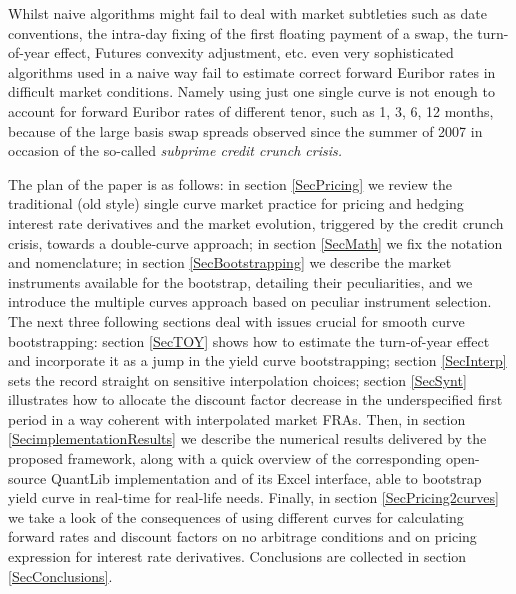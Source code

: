 \documentclass[11pt,reqno]{amsart}
\begin{document}
Whilst naive algorithms might fail to deal with market subtleties such as date conventions, the intra-day fixing of the first floating payment of a swap, the turn-of-year effect, Futures convexity adjustment, etc. even very sophisticated algorithms used in a naive way fail to estimate correct forward Euribor rates in difficult market conditions. Namely using just one single curve is not enough to account for forward Euribor rates of different tenor, such as 1, 3, 6, 12 months, because of the large basis swap spreads observed since the summer of 2007 in occasion of the so-called {\it subprime credit crunch crisis.}

The plan of the paper is as follows: 
in section \ref{SecPricing} we review the traditional (old style) single curve market practice for pricing and hedging interest rate derivatives and the market evolution, triggered by the credit crunch crisis, towards a double-curve approach; 
in section \ref{SecMath} we fix the notation and nomenclature; 
in section \ref{SecBootstrapping} we describe the market instruments available for the bootstrap, detailing their peculiarities, and we  introduce the multiple curves approach based on peculiar instrument selection. 
The next three following sections deal with issues crucial for smooth curve bootstrapping: 
section \ref{SecTOY} shows how to estimate the turn-of-year effect and incorporate it as a jump in the yield curve bootstrapping;
section \ref{SecInterp} sets the record straight on sensitive interpolation choices; 
section \ref{SecSynt} illustrates how to allocate the discount factor decrease in the underspecified first period in a way coherent with interpolated market FRAs.
Then, in section \ref{SecimplementationResults} we describe the numerical results delivered by the proposed framework, along with a quick overview of the corresponding open-source QuantLib implementation and of its Excel interface, able to bootstrap yield curve in real-time for real-life needs.
Finally, in section \ref{SecPricing2curves} we take a look of the consequences of using different curves for calculating forward rates and discount factors on no arbitrage conditions and on pricing expression for interest rate derivatives.
Conclusions are collected in section \ref{SecConclusions}.
\end{document}
